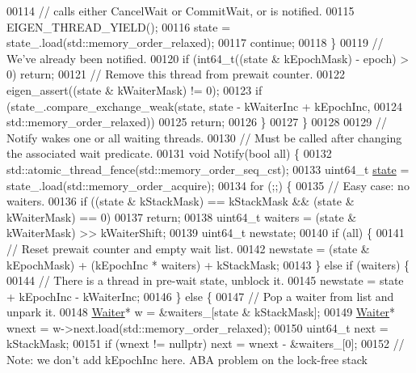 \begin{DoxyCode}
{00114         \textcolor{comment}{// calls either CancelWait or CommitWait, or is notified.}
00115         EIGEN\_THREAD\_YIELD();
00116         state = state\_.load(std::memory\_order\_relaxed);
00117         \textcolor{keywordflow}{continue};
00118       \}
00119       \textcolor{comment}{// We've already been notified.}
00120       \textcolor{keywordflow}{if} (int64\_t((state & kEpochMask) - epoch) > 0) \textcolor{keywordflow}{return};
00121       \textcolor{comment}{// Remove this thread from prewait counter.}
00122       eigen\_assert((state & kWaiterMask) != 0);
00123       \textcolor{keywordflow}{if} (state\_.compare\_exchange\_weak(state, state - kWaiterInc + kEpochInc,
00124                                        std::memory\_order\_relaxed))
00125         \textcolor{keywordflow}{return};
00126     \}
00127   \}
00128 
00129   \textcolor{comment}{// Notify wakes one or all waiting threads.}
00130   \textcolor{comment}{// Must be called after changing the associated wait predicate.}
00131   \textcolor{keywordtype}{void} Notify(\textcolor{keywordtype}{bool} all) \{
00132     std::atomic\_thread\_fence(std::memory\_order\_seq\_cst);
00133     uint64\_t \hyperlink{structstate}{state} = state\_.load(std::memory\_order\_acquire);
00134     \textcolor{keywordflow}{for} (;;) \{
00135       \textcolor{comment}{// Easy case: no waiters.}
00136       \textcolor{keywordflow}{if} ((state & kStackMask) == kStackMask && (state & kWaiterMask) == 0)
00137         \textcolor{keywordflow}{return};
00138       uint64\_t waiters = (state & kWaiterMask) >> kWaiterShift;
00139       uint64\_t newstate;
00140       \textcolor{keywordflow}{if} (all) \{
00141         \textcolor{comment}{// Reset prewait counter and empty wait list.}
00142         newstate = (state & kEpochMask) + (kEpochInc * waiters) + kStackMask;
00143       \} \textcolor{keywordflow}{else} \textcolor{keywordflow}{if} (waiters) \{
00144         \textcolor{comment}{// There is a thread in pre-wait state, unblock it.}
00145         newstate = state + kEpochInc - kWaiterInc;
00146       \} \textcolor{keywordflow}{else} \{
00147         \textcolor{comment}{// Pop a waiter from list and unpark it.}
00148         \hyperlink{class_eigen_1_1_event_count_1_1_waiter}{Waiter}* w = &waiters\_[state & kStackMask];
00149         \hyperlink{class_eigen_1_1_event_count_1_1_waiter}{Waiter}* wnext = w->next.load(std::memory\_order\_relaxed);
00150         uint64\_t next = kStackMask;
00151         \textcolor{keywordflow}{if} (wnext != \textcolor{keyword}{nullptr}) next = wnext - &waiters\_[0];
00152         \textcolor{comment}{// Note: we don't add kEpochInc here. ABA problem on the lock-free stack}
}
\end{DoxyCode}
